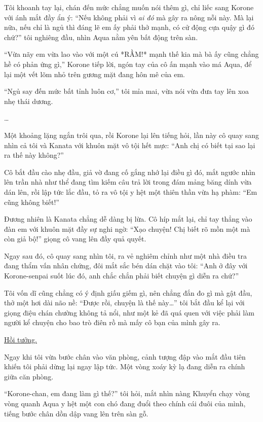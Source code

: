 \documentclass[../main.tex]{subfiles}
\begin{document}
Tôi khoanh tay lại, chán đến mức chẳng muốn nói thêm gì, chỉ liếc sang Korone với ánh mắt đầy ẩn ý: ``Nếu không phải vì \emph{ai đó} mà gây ra nông nỗi này. Mà lại nữa, nếu chỉ là ngủ thì đáng lẽ em ấy phải thở mạnh, có cử động cựa quậy gì đó chứ?'' tôi nghiêng đầu, nhìn Aqua nằm yên bất động trên sàn.

``Vừa nãy em vừa lao vào với một cú *RẦM!* mạnh thế kia mà bà ấy cũng chẳng hề có phản ứng gì,'' Korone tiếp lời, ngón tay của cô ấn mạnh vào má Aqua, để lại một vết lõm nhỏ trên gương mặt đang hôn mê của em.

``Ngủ say đến mức bất tỉnh luôn cơ,'' tôi mỉa mai, vừa nói vừa đưa tay lên xoa nhẹ thái dương.

\dots

Một khoảng lặng ngắn trôi qua, rồi Korone lại lên tiếng hỏi, lần này cô quay sang nhìn cả tôi và Kanata với khuôn mặt vô tội hết mực: ``Anh chị có biết tại sao lại ra thế này không?''

Cô bắt đầu cào nhẹ đầu, giả vờ đang cố gắng nhớ lại điều gì đó, mắt ngước nhìn lên trần nhà như thể đang tìm kiếm câu trả lời trong đám mảng băng dính vừa dán lên, rồi lập tức lắc đầu, tỏ ra vô tội y hệt một thiên thần vừa hạ phàm: ``Em cũng không biết!''

Đương nhiên là Kanata chẳng dễ dàng bị lừa. Cô híp mắt lại, chỉ tay thẳng vào đàn em với khuôn mặt đầy sự nghi ngờ: ``Xạo chuyện! Chị biết rõ mồn một mà còn giả bộ!'' giọng cô vang lên đầy quả quyết.

Ngay sau đó, cô quay sang nhìn tôi, ra vẻ nghiêm chỉnh như một nhà điều tra đang thẩm vấn nhân chứng, đôi mắt sắc bén dán chặt vào tôi: ``Anh ở đây với Korone-senpai suốt lúc đó, anh chắc chắn phải biết chuyện gì diễn ra chứ?''

Tôi vốn dĩ cũng chẳng có ý định giấu giếm gì, nên chẳng đắn đo gì mà gật đầu, thở một hơi dài não nề: ``Được rồi, chuyện là thế này\dots'' tôi bắt đầu kể lại với giọng điệu chán chường không tả nổi, như một kẻ đã quá quen với việc phải làm người kể chuyện cho bao trò điên rồ mà mấy cô bạn của mình gây ra.

\begin{center}
  \uline{Hồi tưởng.}
\end{center}

Ngay khi tôi vừa bước chân vào văn phòng, cảnh tượng đập vào mắt đầu tiên khiến tôi phải dừng lại ngay lập tức. Một vòng xoáy kỳ lạ đang diễn ra chính giữa căn phòng.

``Korone-chan, em đang làm gì thế?'' tôi hỏi, mắt nhìn nàng Khuyển chạy vòng vòng quanh Aqua y hệt một con chó đang đuổi theo chính cái đuôi của mình, tiếng bước chân dồn dập vang lên trên sàn gỗ.
\end{document}
